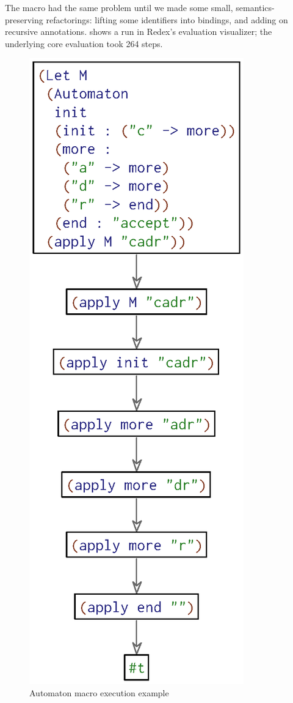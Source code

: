 The  macro had the same problem until we made some
small, semantics-preserving refactorings: lifting some identifiers
into  bindings, and adding \Code{!} on recursive
annotations.  shows a run in Redex's evaluation
visualizer; the underlying core evaluation took 264 steps.

\begin{figure}
  \mbox{}\hfill\includegraphics[width=0.45\columnwidth]{img/automaton-example}\hfill\mbox{}
\caption{Automaton macro execution example}
\label{fig:reval-automaton}
\end{figure}


